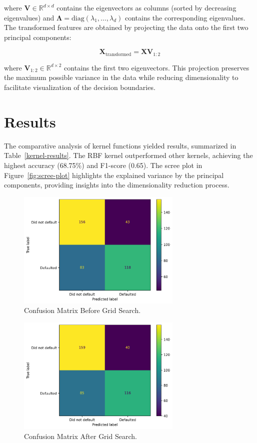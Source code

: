 \documentclass{article}
\begin{document}
where $\mathbf{V} \in \mathbb{R}^{d \times d}$ contains the eigenvectors as columns (sorted by decreasing eigenvalues) and $\boldsymbol{\Lambda} = \text{diag}(\lambda_1, \ldots, \lambda_d)$ contains the corresponding eigenvalues. The transformed features are obtained by projecting the data onto the first two principal components:

\[
\mathbf{X}_{\text{transformed}} = \mathbf{X}\mathbf{V}_{1:2}
\]

where $\mathbf{V}_{1:2} \in \mathbb{R}^{d \times 2}$ contains the first two eigenvectors. This projection preserves the maximum possible variance in the data while reducing dimensionality to facilitate visualization of the decision boundaries.


\section{Results}
The comparative analysis of kernel functions yielded results, summarized in Table~\ref{kernel-results}. The RBF kernel outperformed other kernels, achieving the highest accuracy (68.75\%) and F1-score (0.65). 
The scree plot in Figure~\ref{fig:scree-plot} highlights the explained variance by the principal components, providing insights into the dimensionality reduction process.

\begin{figure}[H]
    \centering
    \includegraphics[width=0.7\textwidth]{../figures/confusion_matrix_pre_gridSearch.png}
    \caption{Confusion Matrix Before Grid Search.}
    \label{fig:confusion-pre-grid}
\end{figure}

\begin{figure}[H]
    \centering
    \includegraphics[width=0.7\textwidth]{../figures/confusion_matrix_post_gridSearch.png}
    \caption{Confusion Matrix After Grid Search.}
    \label{fig:confusion-post-grid}
\end{figure}
\end{document}
